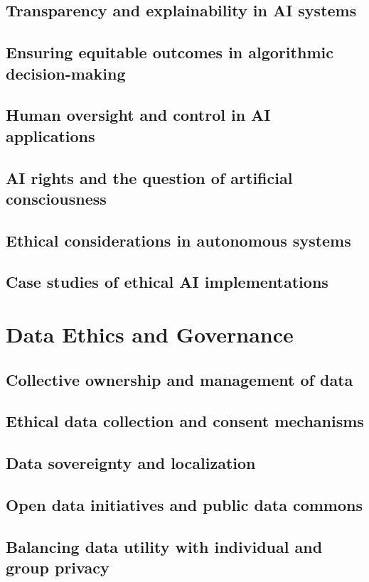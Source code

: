 \subsection{Transparency and explainability in AI systems}
\subsection{Ensuring equitable outcomes in algorithmic decision-making}
\subsection{Human oversight and control in AI applications}
\subsection{AI rights and the question of artificial consciousness}
\subsection{Ethical considerations in autonomous systems}
\subsection{Case studies of ethical AI implementations}

\newpage

\section{Data Ethics and Governance}
\subsection{Collective ownership and management of data}
\subsection{Ethical data collection and consent mechanisms}
\subsection{Data sovereignty and localization}
\subsection{Open data initiatives and public data commons}
\subsection{Balancing data utility with individual and group privacy}
